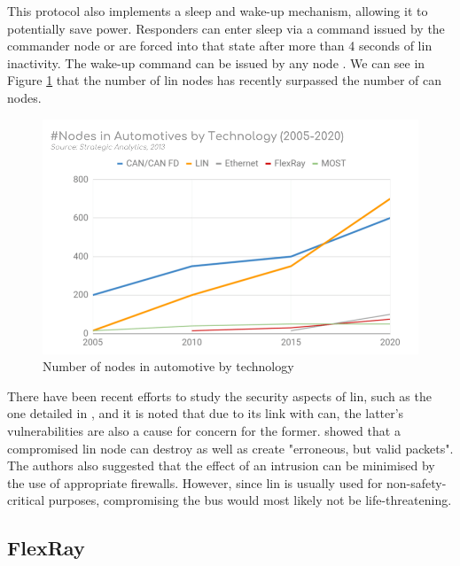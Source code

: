 This protocol also implements a sleep and wake-up mechanism, allowing it to potentially save power. Responders can enter sleep via a command issued by the commander node or are forced into that state after more than 4 seconds of \gls{lin} inactivity. The wake-up command can be issued by any node \citep{LIN}.
We can see in Figure \ref{fig:auto_nodes} that the number of \gls{lin} nodes has recently surpassed the number of \gls{can} nodes.

\begin{figure}
    \centering
    \includegraphics[width = \linewidth]{img/parts/introduction/LIN Nodes.png}
    \caption{Number of nodes in automotive by technology \citep{LIN_CSS}}
    \label{fig:auto_nodes}
\end{figure}

There have been recent efforts to study the security aspects of \gls{lin}, such as the one detailed in \citep{Takahashi2017}, and it is noted that due to its link with \gls{can}, the latter's vulnerabilities are also a cause for concern for the former. \citep{Ernst2018} showed that a compromised \gls{lin} node can destroy as well as create "erroneous, but valid packets". The authors also suggested that the effect of an intrusion can be minimised by the use of appropriate firewalls. However, since \gls{lin} is usually used for non-safety-critical purposes, compromising the bus would most likely not be life-threatening.

\subsection{FlexRay}

